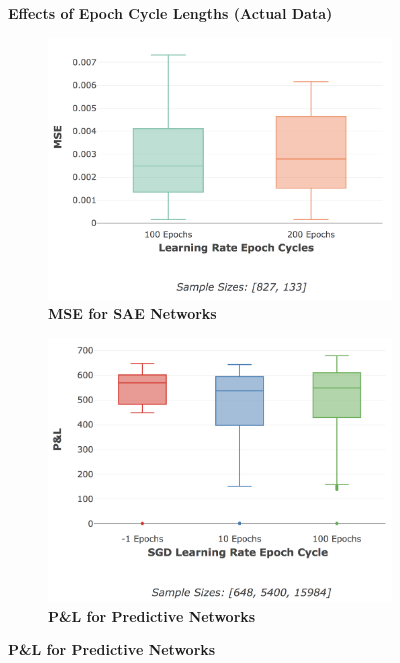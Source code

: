 \documentclass[a4paper,11pt,oneside]{article}
\theoremstyle{plain}
\theoremstyle{definition}
\begin{document}
	\begin{figure}[H]
		\centering
		\textbf{Effects of Epoch Cycle Lengths (Actual Data)}
		\begin{subfigure}{.5\textwidth}
			\centering 
			\includegraphics[scale=0.3]{images/results/network/lr/actual_mse_lr_epochs.png}
			\caption{\textbf{MSE for SAE Networks} 
				\newline }
			\label{figure-actual_mse_lr_epochs}
		\end{subfigure}%
		\begin{subfigure}{.5\textwidth}
			\centering 
			\includegraphics[scale=0.3]{images/results/network/lr/actual_pl_lr_epochs.png}
			\caption{\textbf{P\&L for Predictive Networks} 
}
\end{subfigure}
\end{figure}
\end{document}
